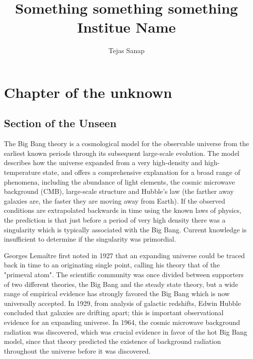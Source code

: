 \documentclass[14pt, twoside]{report}
\title{\large Something something something \\ Institue Name}
\author{Tejas Sanap}
\begin{document}
\maketitle
\tableofcontents
\listoffigures

\chapter{Chapter of the unknown}

\section{Section of the Unseen}

The Big Bang theory is a cosmological model for the observable universe from the earliest known periods through its subsequent large-scale evolution. The model describes how the universe expanded from a very high-density and high-temperature state, and offers a comprehensive explanation for a broad range of phenomena, including the abundance of light elements, the cosmic microwave background (CMB), large-scale structure and Hubble's law (the farther away galaxies are, the faster they are moving away from Earth). If the observed conditions are extrapolated backwards in time using the known laws of physics, the prediction is that just before a period of very high density there was a singularity which is typically associated with the Big Bang. Current knowledge is insufficient to determine if the singularity was primordial.

Georges Lemaître first noted in 1927 that an expanding universe could be traced back in time to an originating single point, calling his theory that of the "primeval atom". The scientific community was once divided between supporters of two different theories, the Big Bang and the steady state theory, but a wide range of empirical evidence has strongly favored the Big Bang which is now universally accepted. In 1929, from analysis of galactic redshifts, Edwin Hubble concluded that galaxies are drifting apart; this is important observational evidence for an expanding universe. In 1964, the cosmic microwave background radiation was discovered, which was crucial evidence in favor of the hot Big Bang model, since that theory predicted the existence of background radiation throughout the universe before it was discovered.
\end{document}

